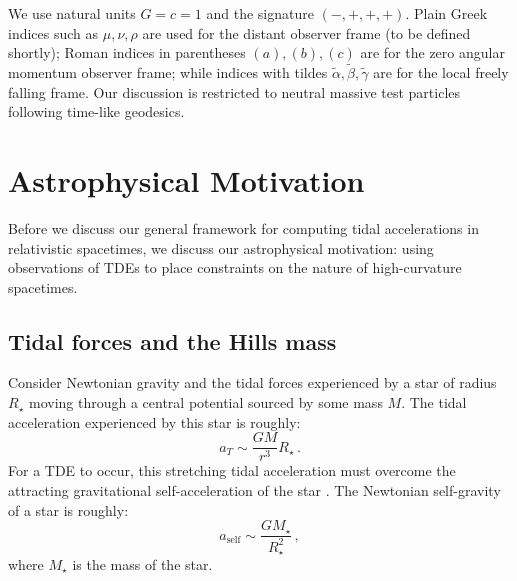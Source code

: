 \documentclass[
    reprint,
    prd,
    nofootinbib,
    amsmath,amssymb,
    aps,
    floatfix,
]{revtex4-2}
\begin{document}
We use natural units $G = c = 1$ and the signature $(-, +, +, +)$. Plain Greek indices such as $\mu, \nu, \rho$ are used for the distant observer frame (to be defined shortly); Roman indices in parentheses $(a), (b), (c)$ are for the zero angular momentum observer frame; while indices with tildes $\tilde{\alpha}, \tilde{\beta}, \tilde{\gamma}$ are for the local freely falling frame. Our discussion is restricted to neutral massive test particles following time-like geodesics.

\section{Astrophysical Motivation} \label{sec:motivation}
Before we discuss our general framework for computing tidal accelerations in relativistic spacetimes, we discuss our astrophysical motivation: using observations of TDEs to place constraints on the nature of high-curvature spacetimes. 

\subsection{Tidal forces and the Hills mass} \label{sec:astro_tidal_forces}
Consider Newtonian gravity and the tidal forces experienced by a star of radius $R_{\star}$ moving through a central potential sourced by some mass $M$. The tidal acceleration experienced by this star is roughly:
\begin{equation}\label{tidal_simple}
    a_{T} \sim \frac{GM}{r^{3}} R_{\star} \, .
\end{equation}
For a TDE to occur, this stretching tidal acceleration must overcome the attracting gravitational self-acceleration of the star \cite{Rees88}. The Newtonian self-gravity of a star is roughly:
\begin{equation}\label{self}
    a_{\text{self}}\sim \frac{GM_{\star}}{R_{\star}^{2}} \, ,
\end{equation}
where $M_{\star}$ is the mass of the star.
\end{document}
